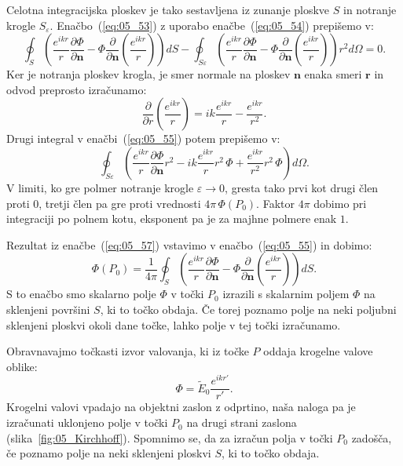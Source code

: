 Celotna integracijska ploskev je tako sestavljena iz zunanje ploskve
$S$ in notranje krogle $S_\varepsilon$. Enačbo~(\ref{eq:05_53}) z uporabo
enačbe~(\ref{eq:05_54}) prepišemo v:
\begin{equation}
\oint_S \left( \frac{e^{ikr}}{r}\frac{\partial \Phi}{\partial \mathbf{n}} -
\Phi\frac{\partial}{\partial \mathbf{n}}\left( \frac{e^{ikr}}{r} \right)\!\! \right) dS -
\oint_{S\varepsilon} \left( \frac{e^{ikr}}{r}\frac{\partial \Phi}{\partial \mathbf{n}} -
\Phi\frac{\partial}{\partial \mathbf{n}}\left( \frac{e^{ikr}}{r} \right)\!\! \right)r^2 d\Omega = 0.
\label{eq:05_55}
\end{equation}
Ker je notranja ploskev krogla, je smer normale na ploskev $\mathbf{n}$ enaka smeri $\mathbf{r}$ in
odvod preprosto izračunamo:
\begin{equation}
\frac{\partial}{\partial r}\left( \frac{e^{ikr}}{r}\right)  = ik \frac{e^{ikr}}{r} - \frac{e^{ikr}}{r^2}.
\label{eq:05_56}
\end{equation}
Drugi integral v enačbi~(\ref{eq:05_55}) potem prepišemo v:
\begin{equation}
\oint_{S\varepsilon} \left( \frac{e^{ikr}}{r}\frac{\partial \Phi}{\partial \mathbf{n}}r^2 -
ik\frac{e^{ikr}}{r}r^2\,\Phi + \frac{e^{ikr}}{r^2}r^2\,\Phi\right) d\Omega.
\label{eq:05_57}
\end{equation}
V limiti, ko gre polmer notranje krogle $\varepsilon \to 0$, gresta tako prvi kot 
drugi člen proti 0, tretji člen pa gre proti vrednosti $4\pi\, \Phi(P_0)$. Faktor $4\pi$ 
dobimo pri integraciji po polnem kotu, eksponent pa je za majhne polmere enak $1$.

Rezultat iz enačbe~(\ref{eq:05_57}) vstavimo v enačbo~(\ref{eq:05_55}) in dobimo:
\begin{equation}
\Phi(P_0) = \frac{1}{4\pi} \oint_S \left( \frac{e^{ikr}}{r}\frac{\partial \Phi}{\partial \mathbf{n}} -
\Phi\frac{\partial}{\partial \mathbf{n}}\left( \frac{e^{ikr}}{r} \right)\!\! \right) dS.
\label{eq:05_58}
\end{equation}
S to enačbo smo skalarno polje $\Phi$ v točki $P_0$ 
izrazili s skalarnim poljem $\Phi$ na sklenjeni površini $S$, ki to točko obdaja. Če torej 
poznamo polje na neki poljubni sklenjeni ploskvi okoli dane točke, lahko polje v tej 
točki izračunamo.

Obravnavajmo točkasti izvor valovanja, ki iz točke $P$ oddaja krogelne valove 
oblike:
\begin{equation}
\Phi = \tilde{E}_0\frac{e^{ikr'}}{r'}.
\label{eq:05_58a}
\end{equation}
Krogelni valovi vpadajo na objektni zaslon z odprtino, 
naša naloga pa je izračunati uklonjeno polje v točki $P_0$ na drugi strani zaslona 
(slika~\ref{fig:05_Kirchhoff}). 
Spomnimo se, da za izračun polja v točki $P_0$ zadošča, če poznamo polje na neki
sklenjeni ploskvi $S$, ki to točko obdaja.

